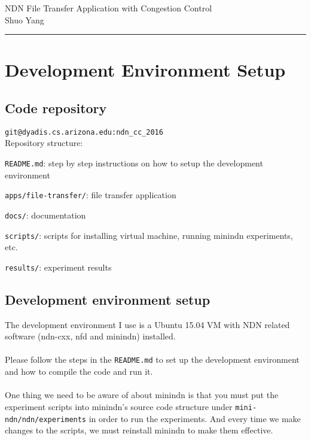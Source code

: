 \documentclass[10pt]{article}
\begin{document}
\noindent


\begin{center}
  NDN File Transfer Application with Congestion Control\\
  Shuo Yang\\
  \vspace{1em}
\end{center}

\hrule\smallskip
\vspace{1em}
\section{Development Environment Setup}

\subsection{Code repository}
\texttt{git@dyadis.cs.arizona.edu:ndn\_cc\_2016}\\

Repository structure:

\texttt{README.md}: step by step instructions on how to setup the development
environment

\texttt{apps/file-transfer/}: file transfer application

\texttt{docs/}: documentation

\texttt{scripts/}: scripts for installing virtual machine, running minindn
experiments, etc.

\texttt{results/}: experiment results

\subsection{Development environment setup}

The development environment I use is a Ubuntu 15.04 VM with NDN
related software (ndn-cxx, nfd and minindn) installed.\\\\
Please follow the steps in the \texttt{README.md} to set up the
development environment and how to compile the code and run it.\\\\
One thing we need to be aware of about minindn is that you must put the
experiment scripts into minindn's source code structure under
\texttt{mini-ndn/ndn/experiments} in order to run the experiments. And
every time we make changes to the scripts, we must reinstall minindn
to make them effective.
\end{document}
